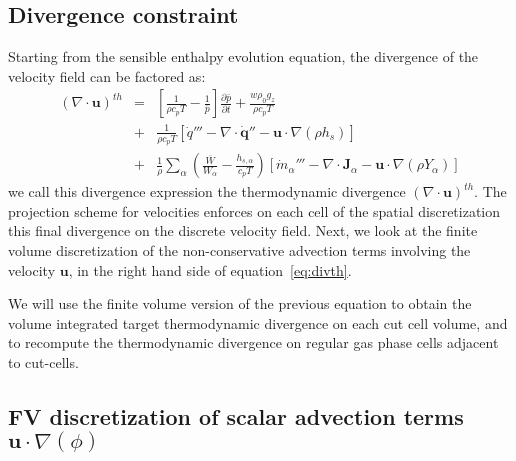 \subsection{Divergence constraint}

Starting from the sensible enthalpy evolution equation, the divergence of the velocity field can be factored as:
%
\begin{eqnarray}
    ( \nabla \cdot \mathbf{u} )^{th} &=&
    \left[ \frac{1}{\rho c_p T} - \frac{1}{\bar{p}} \right]
    \frac{\partial \bar{p}}{\partial t} + \frac{w \rho_0 g_z}{\rho c_p T} \nonumber \\
    &+& \frac{1}{\rho c_p T} \left[ \dot{q}''' - \nabla \cdot \dot{\mathbf{q}}'' - \mathbf{u} \cdot \nabla (\rho h_s) \right] \nonumber \\
    &+& \frac{1}{\rho} \sum_\alpha \left( \frac{\overline{W}}{W_\alpha} - \frac{h_{s,\alpha}}{c_p T} \right) \left[ \dot{m}_\alpha''' - \nabla \cdot \mathbf{J}_\alpha - \mathbf{u} \cdot \nabla (\rho Y_\alpha) \right] \label{eq:divth}
\end{eqnarray}
%
we call this divergence expression the thermodynamic divergence $( \nabla \cdot \mathbf{u} )^{th}$. The projection scheme for velocities enforces on each cell of the spatial discretization this final divergence on the discrete velocity field.
Next, we look at the finite volume discretization of the non-conservative advection terms involving the velocity $\mathbf{u}$, in the right hand side of equation~\eqref{eq:divth}.

We will use the finite volume version of the previous equation to obtain the volume integrated target thermodynamic divergence on each cut cell volume, and to recompute the thermodynamic divergence on regular gas phase cells adjacent to cut-cells.


\subsection{FV discretization of scalar advection terms $\mathbf{u} \cdot \nabla (\phi)$}

